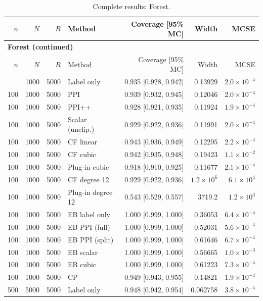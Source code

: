 {\setlength{\tabcolsep}{3pt}\begin{longtable}{rrrlrrr}
\caption{Complete results: Forest.}\\
\toprule $n$ & $N$ & $R$ & Method & Coverage [95\% MC] & Width & MCSE \\
\midrule\endfirsthead
\multicolumn{7}{l}{\textbf{Forest (continued)}}\\
\toprule $n$ & $N$ & $R$ & Method & Coverage [95\% MC] & Width & MCSE \\
\midrule\endhead
\bottomrule\endfoot
100 & 1000 & 5000 & Label only & 0.935 [0.928, 0.942] & 0.13929 & $2.0\times 10^{-4}$ \\
100 & 1000 & 5000 & PPI & 0.939 [0.932, 0.945] & 0.12046 & $2.0\times 10^{-4}$ \\
100 & 1000 & 5000 & PPI++ & 0.928 [0.921, 0.935] & 0.11924 & $1.9\times 10^{-4}$ \\
100 & 1000 & 5000 & Scalar (unclip.) & 0.929 [0.922, 0.936] & 0.11991 & $2.0\times 10^{-4}$ \\
100 & 1000 & 5000 & CF linear & 0.943 [0.936, 0.949] & 0.12295 & $2.2\times 10^{-4}$ \\
100 & 1000 & 5000 & CF cubic & 0.942 [0.935, 0.948] & 0.19423 & $1.1\times 10^{-2}$ \\
100 & 1000 & 5000 & Plug-in cubic & 0.918 [0.910, 0.925] & 0.11677 & $2.1\times 10^{-4}$ \\
100 & 1000 & 5000 & CF degree 12 & 0.929 [0.922, 0.936] & $1.2\times 10^{6}$ & $6.1\times 10^{4}$ \\
100 & 1000 & 5000 & Plug-in degree 12 & 0.543 [0.529, 0.557] & 3719.2 & $1.2\times 10^{3}$ \\
100 & 1000 & 5000 & EB label only & 1.000 [0.999, 1.000] & 0.36053 & $6.4\times 10^{-4}$ \\
100 & 1000 & 5000 & EB PPI (full) & 1.000 [0.999, 1.000] & 0.52031 & $5.6\times 10^{-4}$ \\
100 & 1000 & 5000 & EB PPI (split) & 1.000 [0.999, 1.000] & 0.61646 & $6.7\times 10^{-4}$ \\
100 & 1000 & 5000 & EB scalar & 1.000 [0.999, 1.000] & 0.56665 & $1.0\times 10^{-3}$ \\
100 & 1000 & 5000 & EB cubic & 1.000 [0.999, 1.000] & 0.61223 & $7.3\times 10^{-4}$ \\
100 & 1000 & 5000 & CP & 0.949 [0.943, 0.955] & 0.14821 & $1.9\times 10^{-4}$ \\
500 & 5000 & 5000 & Label only & 0.948 [0.942, 0.954] & 0.062758 & $3.8\times 10^{-5}$ \\

\end{longtable}}

